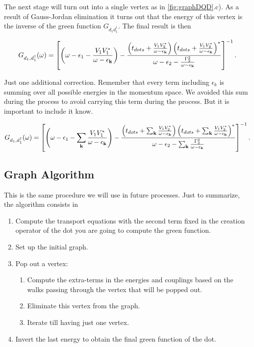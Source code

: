 \documentclass[showpacs,aps,prb,reprint,superscriptaddress]{revtex4-1}
\begin{document}
The next  stage will turn out into a single vertex as in \ref{fig:graphDQD}.c). As a result of Gauss-Jordan elimination it turns out that the energy of this vertex is the inverse of the green function $G_{d_1d^\dagger_1}$. The final result is then 

\begin{equation}
    G_{d_{1},d_{1}^{\dagger}}(\omega)=\left[\left(\omega-\epsilon_{1}-\frac{V_{1}V_{1}^{*}}{\omega-\epsilon_{\mathbf{k}}}\right)-\frac{\left(t_{dots}+\frac{V_{1}V_{2}^{*}}{\omega-\epsilon_{\mathbf{k}}}\right)\left(t_{dots}+\frac{V_{1}V_{2}^{*}}{\omega-\epsilon_{\mathbf{k}}}\right)^{*}}{\omega-\epsilon_{2}-\frac{\Gamma_{2}^{2}}{\omega-\epsilon_{\mathbf{k}}}}\right]^{-1}. \label{eq:solGreen}
\end{equation}

Just one additional correction. Remember that every term including $\epsilon_k$ is summing over all possible energies in the momentum space. We avoided this sum during the process to avoid carrying this term during the process. But it is important to include it know.  

\begin{equation}
     G_{d_{1},d_{1}^{\dagger}}(\omega)=\left[\left(\omega-\epsilon_{1}-\sum_{\mathbf{k}}\frac{V_{1}V_{1}^{*}}{\omega-\epsilon_{\mathbf{k}}}\right)-\frac{\left(t_{dots}+\sum_{\mathbf{k}}\frac{V_{1}V_{2}^{*}}{\omega-\epsilon_{\mathbf{k}}}\right)\left(t_{dots}+\sum_{\mathbf{k}}\frac{V_{1}V_{2}^{*}}{\omega-\epsilon_{\mathbf{k}}}\right)^{*}}{\omega-\epsilon_{2}-\sum_{\mathbf{k}}\frac{\Gamma_{2}^{2}}{\omega-\epsilon_{\mathbf{k}}}}\right]^{-1}. \label{eq:SumSolGreen}
\end{equation}

\subsection{Graph Algorithm \label{sec:Algorithm}}

This is the same procedure we will use in future processes. Just to summarize, the algorithm consists in 
\begin{enumerate}
    \item Compute the transport equations with the second term fixed in the creation operator of the dot  you are going to compute the green function. 
     \item Set up the initial graph.
    \item Pop out a vertex:
    \begin{enumerate}
        \item Compute the extra-terms in the energies and couplings based on the walks passing through the vertex that will be popped out.
        \item Eliminate this vertex from the graph. 
        \item Iterate till having just one vertex. 
        \end{enumerate}
    \item Invert the last energy to obtain the final green function of the dot.
\end{enumerate}
\end{document}
